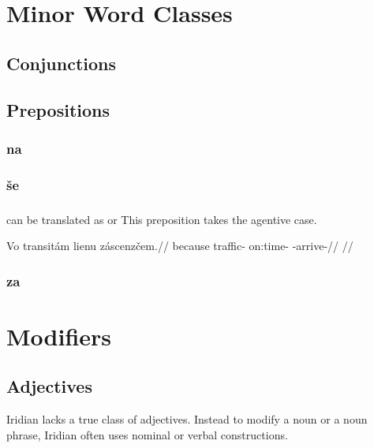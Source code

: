 \chapter{Minor Word Classes}\label{chap:minor}

\section{Conjunctions}

\section{Prepositions}

\subsection{na}

\subsection{\v{s}e}

\subsection{}

 can be translated as  or  This preposition takes the agentive case.

\pex
\begingl
\gla Vo transit\'am lienu z\'ascenz\v{c}em.//
\glb because traffic- on:time- -arrive-//
\glft {}//
\endgl
\xe

\subsection{za}

\chapter{Modifiers}

\section{Adjectives}
Iridian lacks a true class of adjectives. Instead to modify a noun or a noun phrase, Iridian often uses nominal or verbal constructions.

